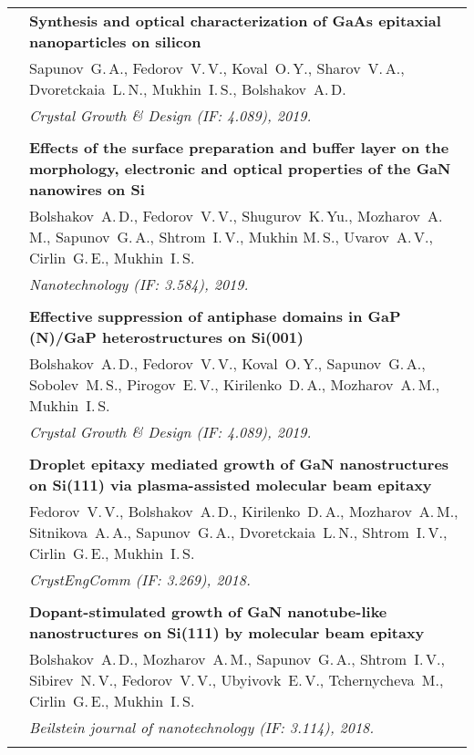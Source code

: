 \documentclass[letterpaper, 11pt]{article}
\begin{document}
\begin{longtable}{p{1.3in}p{4.8in}}
        & \textbf{Synthesis and optical characterization of GaAs epitaxial
        nanoparticles on silicon} \\
        & Sapunov~G.\,A., Fedorov~V.\,V., Koval~O.\,Y., Sharov~V.\,A.,
        Dvoretckaia~L.\,N., Mukhin~I.\,S., Bolshakov~A.\,D. \\
        & \textit{Crystal Growth \& Design (IF: 4.089), 2019.}\\
		& \\
		
        & \textbf{Effects of the surface preparation and buffer layer on the
        morphology, electronic and optical properties of the GaN nanowires on
        Si} \\
        & Bolshakov~A.\,D., Fedorov~V.\,V., Shugurov~K.\,Yu., Mozharov~A.\,M.,
        Sapunov~G.\,A., Shtrom~I.\,V., Mukhin M.\,S., Uvarov~A.\,V.,
        Cirlin~G.\,E., Mukhin~I.\,S. \\
        & \textit{Nanotechnology (IF: 3.584), 2019.}\\
		& \\
		
        & \textbf{Effective suppression of antiphase domains in GaP (N)/GaP
        heterostructures on Si(001)} \\
        & Bolshakov~A.\,D., Fedorov~V.\,V., Koval~O.\,Y., Sapunov~G.\,A.,
        Sobolev~M.\,S., Pirogov~E.\,V., Kirilenko~D.\,A., Mozharov~A.\,M.,
        Mukhin~I.\,S. \\
        & \textit{Crystal Growth \& Design (IF: 4.089), 2019.}\\
		& \\
		
        & \textbf{Droplet epitaxy mediated growth of GaN nanostructures on
        Si(111) via plasma-assisted molecular beam epitaxy} \\
        & Fedorov~V.\,V., Bolshakov~A.\,D., Kirilenko~D.\,A., Mozharov~A.\,M.,
        Sitnikova~A.\,A., Sapunov~G.\,A., Dvoretckaia~L.\,N., Shtrom~I.\,V.,
        Cirlin~G.\,E., Mukhin~I.\,S. \\
        & \textit{CrystEngComm (IF: 3.269), 2018.}\\
		& \\

        & \textbf{Dopant-stimulated growth of GaN nanotube-like nanostructures
        on Si(111) by molecular beam epitaxy} \\
        & Bolshakov~A.\,D., Mozharov~A.\,M., Sapunov~G.\,A., Shtrom~I.\,V.,
        Sibirev~N.\,V., Fedorov~V.\,V., Ubyivovk~E.\,V., Tchernycheva~M.,
        Cirlin~G.\,E., Mukhin~I.\,S. \\
        & \textit{Beilstein journal of nanotechnology (IF: 3.114), 2018.}\\
		& \\


\end{longtable}
\end{document}
